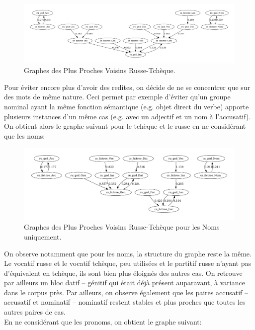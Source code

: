 \documentclass{cours}
\begin{document}
\begin{figure}[H]
	\centering
	\includegraphics[width=\textwidth]{Figures/GNN/gnn_ru_gsd_cs_fictree}
	\caption{Graphes des Plus Proches Voisins Russe-Tchèque.}
\end{figure}

Pour éviter encore plus d'avoir des redites, on décide de ne se concentrer que sur des mots de même nature.
Ceci permet par exemple d'éviter qu'un groupe nominal ayant la même fonction sémantique (e.g. objet direct du verbe) apporte plusieurs instances d'un même cas (e.g. avec un adjectif et un nom à l'accusatif).
On obtient alors le graphe suivant pour le tchèque et le russe en ne considérant que les noms:

\begin{figure}[H]
	\centering
	\includegraphics[width=\textwidth]{Figures/GNN/gnn_ru_gsd_cs_fictree_Nouns_Only}
	\caption{Graphes des Plus Proches Voisins Russe-Tchèque pour les Noms uniquement.}
\end{figure}

On observe notamment que pour les noms, la structure du graphe reste la même.
Le vocatif russe et le vocatif tchèque, peu utilisées et le partitif russe n'ayant pas d'équivalent en tchèque, ils sont bien plus éloignés des autres cas.
On retrouve par ailleurs un bloc datif -- génitif qui était déjà présent auparavant, à variance dans le corpus près.
Par ailleurs, on observe également que les paires accusatif -- accusatif et nominatif -- nominatif restent stables et plus proches que toutes les autres paires de cas.\\
En ne considérant que les pronoms, on obtient le graphe suivant:
\end{document}
